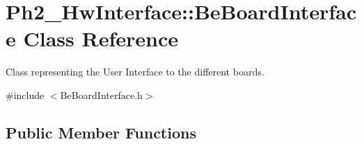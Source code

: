 \hypertarget{class_ph2___hw_interface_1_1_be_board_interface}{\section{Ph2\-\_\-\-Hw\-Interface\-:\-:Be\-Board\-Interface Class Reference}
\label{class_ph2___hw_interface_1_1_be_board_interface}
}


Class representing the User Interface to the different boards.  




{\ttfamily \#include $<$Be\-Board\-Interface.\-h$>$}

\subsection*{Public Member Functions}
